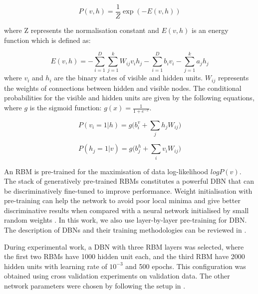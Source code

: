 \documentclass[a4paper]{article}
\newcommand*{\JE}[1]{\textcolor{magenta}{#1}}
\begin{document}
\begin{equation}
    P(v,h)= \frac{1}{Z}\exp({-E(v,h)})
\end{equation}

where Z represents the normalisation constant and $E(v, h)$ is an energy
function which is defined as:

\begin{equation}
    E(v,h)=  -\sum_{i=1}^{D}\sum_{j=1}^{k}W_{ij}v_{i}h_{j}-\sum_{i=1}^{D}b_{i}v_{i}-\sum_{j=1}^{k}a_{j}h_{j}
\end{equation}
where $v_{i}$ and $h_{i}$ are the binary states of visible and hidden units. $W_{ij}$ represents the weights of connections between hidden and visible nodes. The conditional probabilities for the visible and hidden units are given by the following equations, where $g$ is the sigmoid function: $g(x)= \frac{1}{1+e^{-x}}$.

\begin{equation}
    P(v_{i}=1|h)= g\big(b_{i}^{v}+ \sum_{j}h_{j}W_{ij}\big)
\end{equation}

\begin{equation}
    P(h_{j}=1|v)= g\big(b_{j}^{h}+ \sum_{i}v_{i}W_{ij}\big)
\end{equation}




An RBM is pre-trained for the maximisation of data log-likelihood $log P (v)$. The stack of generatively pre-trained RBMs constitutes a powerful DBN that can be discriminatively fine-tuned to improve performance. Weight initialisation with pre-training can help the network to avoid poor local minima and give better discriminative results when compared with a neural network initialised by small random weights \cite{erhan2010does}. In this work, we also use layer-by-layer pre-training for DBN. The description of DBNs and their training methodologies can be reviewed in \cite{hinton2002training,hinton2006fast}.

During experimental work, a DBN with three RBM layers was selected, where the first two RBMs have 1000 hidden unit each, and the third RBM have 2000 hidden units with learning rate of $10^{-3}$ and 500 epochs. This configuration was obtained using cross validation experiments on  validation data. %
The other network parameters were chosen by following the setup in \cite{rana2016emotion,keyvanrad2014brief}. 
\end{document}
